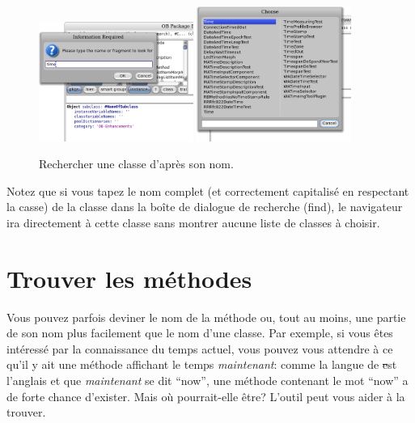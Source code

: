 \documentclass[a4paper,10pt,twoside]{book}
\begin{document}
\begin{figure}[hbt]
\centerline{
	\includegraphics[width=0.45\textwidth]{FindIt}
	\hspace{1cm}
	\includegraphics[width=0.45\textwidth]{TimeClasses}
}
\caption{Rechercher une classe d'après son nom.}
\end{figure}

Notez que si vous tapez le nom complet (et correctement capitalisé 
\cad en respectant la casse)
de la classe dans la boîte de dialogue de recherche (find), le
navigateur ira directement à cette classe sans montrer aucune liste
de classes à choisir.

\section{Trouver les méthodes}

Vous pouvez parfois deviner le nom de la méthode ou, tout au moins,
une partie de son nom plus facilement que le nom d'une classe.
Par exemple, si vous êtes intéressé par la connaissance du temps
actuel, vous pouvez vous attendre à ce qu'il y ait 
une méthode affichant le temps \emph{maintenant}: comme la langue de \st
est l'anglais et que \emph{maintenant} se dit ``now'', une méthode
contenant le mot ``now'' a de forte chance d'exister.
Mais où pourrait-elle être?
L'outil  peut vous aider à la trouver.
\end{document}
